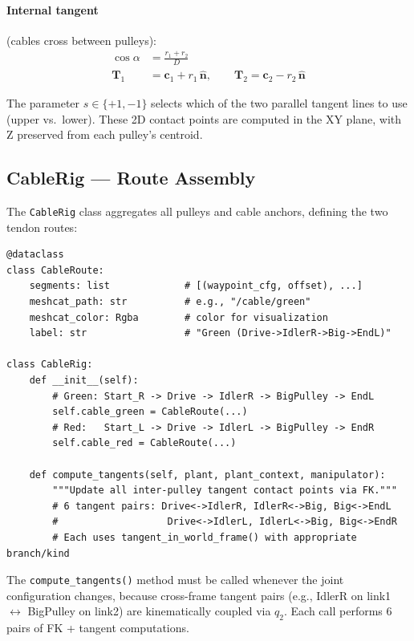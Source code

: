 \documentclass[11pt,a4paper]{article}
\begin{document}
\paragraph{Internal tangent} (cables cross between pulleys):
\begin{align}
    \cos\alpha &= \frac{r_1 + r_2}{D} \nonumber \\
    \bm{T}_1 &= \bm{c}_1 + r_1\,\hat{\bm{n}}, \qquad \bm{T}_2 = \bm{c}_2 - r_2\,\hat{\bm{n}}
    \label{eq:int_tangent}
\end{align}

The parameter $s \in \{+1, -1\}$ selects which of the two parallel tangent lines to use (upper vs.\ lower).  These 2D contact points are computed in the XY plane, with Z preserved from each pulley's centroid.

\subsection{CableRig --- Route Assembly}

The \texttt{CableRig} class aggregates all pulleys and cable anchors, defining the two tendon routes:

\begin{lstlisting}[caption={Cable route definitions --- \texttt{cable.py}}]
@dataclass
class CableRoute:
    segments: list             # [(waypoint_cfg, offset), ...]
    meshcat_path: str          # e.g., "/cable/green"
    meshcat_color: Rgba        # color for visualization
    label: str                 # "Green (Drive->IdlerR->Big->EndL)"

class CableRig:
    def __init__(self):
        # Green: Start_R -> Drive -> IdlerR -> BigPulley -> EndL
        self.cable_green = CableRoute(...)
        # Red:   Start_L -> Drive -> IdlerL -> BigPulley -> EndR
        self.cable_red = CableRoute(...)

    def compute_tangents(self, plant, plant_context, manipulator):
        """Update all inter-pulley tangent contact points via FK."""
        # 6 tangent pairs: Drive<->IdlerR, IdlerR<->Big, Big<->EndL
        #                   Drive<->IdlerL, IdlerL<->Big, Big<->EndR
        # Each uses tangent_in_world_frame() with appropriate branch/kind
\end{lstlisting}

\begin{codemath}
The \texttt{compute\_tangents()} method must be called whenever the joint configuration changes, because cross-frame tangent pairs (e.g., IdlerR on link1 $\leftrightarrow$ BigPulley on link2) are kinematically coupled via $q_2$.  Each call performs 6 pairs of FK + tangent computations.
\end{codemath}
\end{document}
